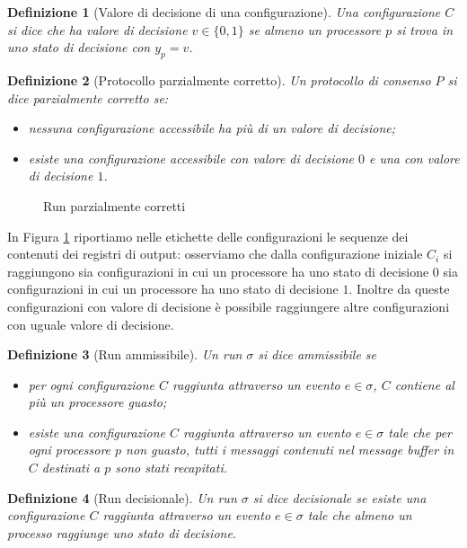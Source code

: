 \documentclass{article}
\newtheorem{definizione}{Definizione}
\begin{document}
\begin{definizione}[Valore di decisione di una configurazione]
  Una configurazione $C$ si dice che \emph{ha valore di decisione} $v
  \in \{0,1\}$ se almeno un processore $p$ si trova in uno stato di
  decisione con $y_p=v$.
\end{definizione}

\begin{definizione}[Protocollo parzialmente corretto]
  Un protocollo di consenso $P$ si dice \emph{parzialmente corretto}
  se:
\begin{itemize}
\item nessuna configurazione accessibile ha più di un valore di
  decisione;
\item esiste una configurazione accessibile con valore di decisione
  $0$ e una con valore di decisione $1$.
\end{itemize}  
\end{definizione}

\begin{figure}[!h]
  \centering \caption{Run
    parzialmente corretti}\label{fig:parzialmenteCorretto}
\end{figure}

In Figura \ref{fig:parzialmenteCorretto} riportiamo nelle etichette
delle configurazioni le sequenze dei contenuti dei registri di output:
osserviamo che dalla configurazione iniziale $C_i$ si raggiungono sia
configurazioni in cui un processore ha uno stato di decisione $0$ sia
configurazioni in cui un processore ha uno stato di decisione
$1$. Inoltre da queste configurazioni con valore di decisione \`e
possibile raggiungere altre configurazioni con uguale valore di
decisione.

\begin{definizione}[Run ammissibile]
  Un run $\sigma$ si dice \emph{ammissibile} se 
  \begin{itemize}
  \item per ogni configurazione $C$ raggiunta attraverso un evento
    $e\in \sigma$, $C$ contiene al più un processore guasto;
  \item esiste una configurazione $C$ raggiunta attraverso un evento
    $e\in \sigma$ tale che per ogni processore $p$ non guasto, tutti i
    messaggi contenuti nel message buffer in $C$ destinati a $p$ sono
    stati recapitati.
  \end{itemize}
\end{definizione}

\begin{definizione}[Run decisionale]
  Un run $\sigma$ si dice \emph{decisionale} se esiste una
  configurazione $C$ raggiunta attraverso un evento $e\in \sigma$ tale
  che almeno un processo raggiunge uno stato di decisione.
\end{definizione}
\end{document}
